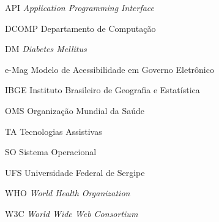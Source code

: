 
\begin{siglas}
  	\item[API]{\textit{Application Programming Interface}}
  	\item[DCOMP]{Departamento de Computação}
  	\item[DM]{\textit{Diabetes Mellitus}}
  	\item[e-Mag]{Modelo de Acessibilidade em Governo Eletrônico}
  	\item[IBGE]{Instituto Brasileiro de Geografia e Estatística}
  	\item[OMS]{Organização Mundial da Saúde}
  	\item[TA]{Tecnologias Assistivas}
  	\item[SO]{Sistema Operacional}
	\item[UFS]{Universidade Federal de Sergipe}
  	\item[WHO]{\textit{World Health Organization}}
  	\item[W3C]{\textit{World Wide Web Consortium}}
\end{siglas}